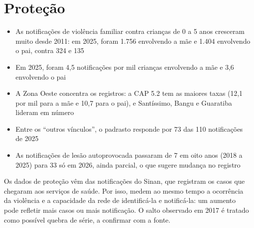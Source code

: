 
\chapter{Proteção}\label{cap:eixo-4}

\begin{achados}\begin{itemize}

\item As notificações de violência familiar contra crianças de 0 a 5 anos cresceram muito desde 2011: em 2025, foram 1.756 envolvendo a mãe e 1.404 envolvendo o pai, contra 324 e 135

\item Em 2025, foram 4,5 notificações por mil crianças envolvendo a mãe e 3,6 envolvendo o pai

\item A Zona Oeste concentra os registros: a CAP 5.2 tem as maiores taxas (12,1 por mil para a mãe e 10,7 para o pai), e Santíssimo, Bangu e Guaratiba lideram em número

\item Entre os “outros vínculos”, o padrasto responde por 73 das 110 notificações de 2025

\item As notificações de lesão autoprovocada passaram de 7 em oito anos (2018 a 2025) para 33 só em 2026, ainda parcial, o que sugere mudança no registro

\end{itemize}\end{achados}

Os dados de proteção vêm das notificações do Sinan, que registram os casos que chegaram aos serviços de saúde. Por isso, medem ao mesmo tempo a ocorrência da violência e a capacidade da rede de identificá-la e notificá-la: um aumento pode refletir mais casos ou mais notificação. O salto observado em 2017 é tratado como possível quebra de série, a confirmar com a fonte.

